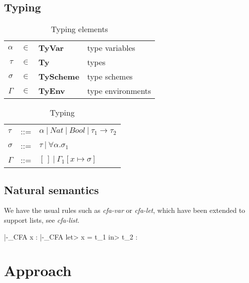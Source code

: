 \documentclass[a4paper]{article}
\begin{document}
\subsection{Typing}

\begin{table}
    \centering
    \begin{tabular}{rcll}
        $\alpha$ &      $\in$ & \textbf{TyVar}    & type variables  \\
        $\tau$&         $\in$ & \textbf{Ty}       & types \\
        $\sigma $&      $\in$ & \textbf{TyScheme} & type schemes\\
        $\Gamma$&       $\in$ & \textbf{TyEnv}    & type environments  \\
    \end{tabular}
    \caption{Typing elements}
    \label{tab:typingelems}
\end{table}
\begin{table}
    \centering
    \begin{tabular}{lcl}
        $\tau$   & ::= & $\alpha \:|\: Nat \: | \: Bool \: | \: \tau_1 \rightarrow \tau_2 $ \\ 
        $\sigma$ & ::= & $\tau \:|\: \forall \alpha. \sigma_1 $ \\ 
        $\Gamma$ & ::= & $[\,] \:|\: \Gamma_1[x \mapsto \sigma] $ \\
    \end{tabular}
    \caption{Typing}
    \label{tab:typing}
\end{table}


\subsection{Natural semantics}

We have the usual rules such as \emph{cfa-var} or \emph{cfa-let}, which have been extended to support lists, see \emph{cfa-list}. 

{\widehat{\Gamma} |-_{CFA} x  : \widehat{\sigma}}
{\widehat{\Gamma} |-_{CFA}\: \<let>\: x = t_1\: \<in>\: t_2 : \widehat{\tau}}


\section{Approach}
\end{document}
